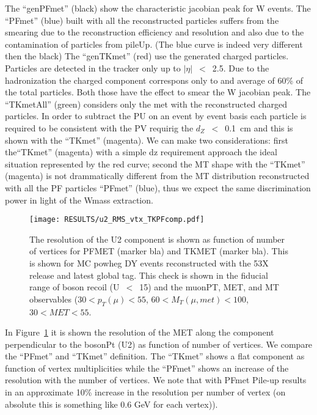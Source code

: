 The ``genPFmet'' (black) show the characteristic jacobian peak for W events.
The ``PFmet'' (blue) built with all the reconstructed particles suffers from the smearing due to the reconstruction efficiency and resolution and also due to the contamination of particles from pileUp. (The blue curve is indeed very different then the black)
The ``genTKmet'' (red) use the generated charged particles. Particles are detected in the tracker only up to $|\eta|$~$<$~2.5. Due to the hadronization the charged component correspons only to and average of 60\% of the total particles. Both those have the effect to smear the W jacobian peak. 
The ``TKmetAll'' (green) considers only the met with the reconstructed charged particles. 
In order to subtract the PU on an event by event basis each particle is required to be consistent with the PV requirig the $d_{Z}$~$<$~0.1~cm and this is shown with the ``TKmet'' (magenta). 
We can make two considerations: first the``TKmet'' (magenta) with a simple dz requirement approach the ideal situation represented by the red curve; second the MT shape with the ``TKmet'' (magenta) is not drammatically different from the MT distribution reconstructed with all the PF particles ``PFmet'' (blue), thus we expect the same discrimination power in light of the Wmass extraction.

\begin{figure}[h!]
  \begin{center}
    \texttt{[image: RESULTS/u2\_RMS\_vtx\_TKPFcomp.pdf]}
    \caption{The resolution of the U2 component is shown as function of number of vertices for PFMET (marker bla) and TKMET (marker bla). This is shown for MC powheg DY events reconstructed with the 53X release and latest global tag. This check is shown in the fiducial range of boson recoil (U~$<$~15) and 
 the muonPT, MET, and MT observables ($30<p_{T}(\mu)<55$, $60<M_{T}(\mu,met)<100$, $30<MET<55$.
}
    \label{fig:PFMETvsTKMETresVTX}
  \end{center}
\end{figure}

In Figure~\ref{fig:PFMETvsTKMETresVTX} it is shown the resolution of the MET along the component perpendicular to the bosonPt (U2) as function of number of vertices. We compare the ``PFmet'' and ``TKmet'' definition. The ``TKmet'' shows a flat component as function of vertex multiplicities while the ``PFmet'' shows an increase of the resolution with the number of vertices. We note that with PFmet Pile-up results in an approximate 10\% increase in the resolution per number of vertex (on absolute this is something like 0.6 GeV for each vertex)).

